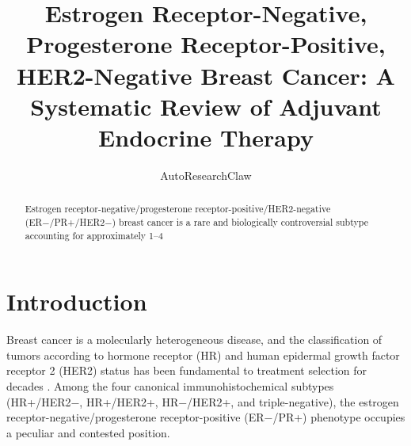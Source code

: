 \documentclass{article}
\title{Estrogen Receptor-Negative, Progesterone Receptor-Positive, HER2-Negative Breast Cancer: A Systematic Review of Adjuvant Endocrine Therapy}
\author{AutoResearchClaw}
\begin{document}
\maketitle


\begin{abstract}


Estrogen receptor-negative/progesterone receptor-positive/HER2-negative (ER−/PR+/HER2−) breast cancer is a rare and biologically controversial subtype accounting for approximately 1–4%

\end{abstract}

\section{Introduction}

Breast cancer is a molecularly heterogeneous disease, and the classification of tumors according to hormone receptor (HR) and human epidermal growth factor receptor 2 (HER2) status has been fundamental to treatment selection for decades \citep{perou2000}. Among the four canonical immunohistochemical subtypes (HR+/HER2−, HR+/HER2+, HR−/HER2+, and triple-negative), the estrogen receptor-negative/progesterone receptor-positive (ER−/PR+) phenotype occupies a peculiar and contested position.
\end{document}
